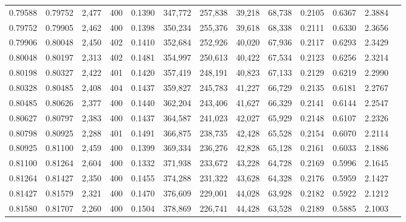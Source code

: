 \begin{tabular}{rrrrrrrrrrrrr}
0.79588 & 0.79752 & 2,477 & 400 &                                     0.1390 & 347,772 & 257,838 &  39,218 &  68,738 & 0.2105 & 0.6367 & 2.3884 \\
0.79752 & 0.79905 & 2,462 & 400 &                                     0.1398 & 350,234 & 255,376 &  39,618 &  68,338 & 0.2111 & 0.6330 & 2.3656 \\
0.79906 & 0.80048 & 2,450 & 402 &                                     0.1410 & 352,684 & 252,926 &  40,020 &  67,936 & 0.2117 & 0.6293 & 2.3429 \\
0.80048 & 0.80197 & 2,313 & 402 &                                     0.1481 & 354,997 & 250,613 &  40,422 &  67,534 & 0.2123 & 0.6256 & 2.3214 \\
0.80198 & 0.80327 & 2,422 & 401 &                                     0.1420 & 357,419 & 248,191 &  40,823 &  67,133 & 0.2129 & 0.6219 & 2.2990 \\
0.80328 & 0.80485 & 2,408 & 404 &                                     0.1437 & 359,827 & 245,783 &  41,227 &  66,729 & 0.2135 & 0.6181 & 2.2767 \\
0.80485 & 0.80626 & 2,377 & 400 &                                     0.1440 & 362,204 & 243,406 &  41,627 &  66,329 & 0.2141 & 0.6144 & 2.2547 \\
0.80627 & 0.80797 & 2,383 & 400 &                                     0.1437 & 364,587 & 241,023 &  42,027 &  65,929 & 0.2148 & 0.6107 & 2.2326 \\
0.80798 & 0.80925 & 2,288 & 401 &                                     0.1491 & 366,875 & 238,735 &  42,428 &  65,528 & 0.2154 & 0.6070 & 2.2114 \\
0.80925 & 0.81100 & 2,459 & 400 &                                     0.1399 & 369,334 & 236,276 &  42,828 &  65,128 & 0.2161 & 0.6033 & 2.1886 \\
0.81100 & 0.81264 & 2,604 & 400 &                                     0.1332 & 371,938 & 233,672 &  43,228 &  64,728 & 0.2169 & 0.5996 & 2.1645 \\
0.81264 & 0.81427 & 2,350 & 400 &                                     0.1455 & 374,288 & 231,322 &  43,628 &  64,328 & 0.2176 & 0.5959 & 2.1427 \\
0.81427 & 0.81579 & 2,321 & 400 &                                     0.1470 & 376,609 & 229,001 &  44,028 &  63,928 & 0.2182 & 0.5922 & 2.1212 \\
0.81580 & 0.81707 & 2,260 & 400 &                                     0.1504 & 378,869 & 226,741 &  44,428 &  63,528 & 0.2189 & 0.5885 & 2.1003 \\

\end{tabular}
